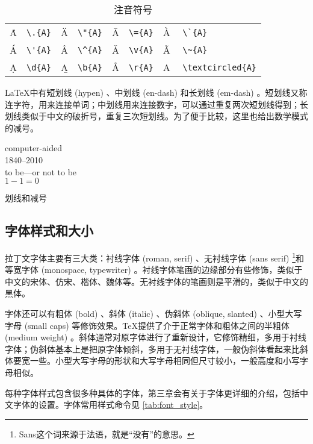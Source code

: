 \begin{table}[htbp]
\centering
\caption{注音符号}
\label{tab:accent}
\lmr
\begin{tabular}{lp{40pt}lp{40pt}lp{40pt}lp{85pt}}
    \toprule
    \.{A} & \verb|\.{A}| & \"{A} & \verb|\"{A}| & 
        \={A} & \verb|\={A}| & \`{A} & \verb|\`{A}| \\
    \'{A} & \verb|\'{A}| & \^{A} & \verb|\^{A}| & 
        \v{A} & \verb|\v{A}| & \~{A} & \verb|\~{A}| \\
    \d{A} & \verb|\d{A}| & \b{A} & \verb|\b{A}| & 
        \r{A} & \verb|\r{A}| & \textcircled{A} & \verb|\textcircled{A}| \\
    \bottomrule
\end{tabular}
\rmfamily
\end{table}

\LaTeX 中有短划线 (hypen) 、中划线 (en-dash) 和长划线 (em-dash) 。短划线又称连字符，用来连接单词；中划线用来连接数字，可以通过重复两次短划线得到；长划线类似于中文的破折号，重复三次短划线。为了便于比较，这里也给出数学模式的减号。

\begin{example}[h]
\begin{RLDemo}[]
computer-aided\\
1840--2010\\
to be---or not to be\\
$1-1=0$
\end{RLDemo}
\caption{划线和减号}
\label{exa:dash}
\end{example}

\subsection{字体样式和大小}
\label{sec:font_style}

拉丁文字体主要有三大类：衬线字体 (roman, serif) 、无衬线字体 (sans serif) \footnote{Sans这个词来源于法语，就是“没有”的意思。}和等宽字体 (monospace, typewriter) 。衬线字体笔画的边缘部分有些修饰，类似于中文的宋体、仿宋、楷体、魏体等。无衬线字体的笔画则是平滑的，类似于中文的黑体。

字体还可以有粗体 (bold) 、斜体 (italic) 、伪斜体 (oblique, slanted) 、小型大写字母 (small caps) 等修饰效果。\TeX 提供了介于正常字体和粗体之间的半粗体 (medium weight) 。斜体通常对原字体进行了重新设计，它修饰精细，多用于衬线字体；伪斜体基本上是把原字体倾斜，多用于无衬线字体，一般伪斜体看起来比斜体要宽一些。小型大写字母的形状和大写字母相同但尺寸较小，一般高度和小写字母相似。

每种字体样式包含很多种具体的字体，第三章会有关于字体更详细的介绍，包括中文字体的设置。字体常用样式命令见 \autoref{tab:font_style}。

